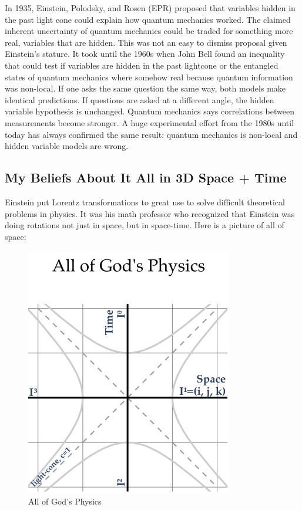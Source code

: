 In 1935, Einstein, Polodsky, and Rosen (EPR) proposed that variables
hidden in the past light cone could explain how quantum mechanics
worked. The claimed inherent uncertainty of quantum mechanics could be
traded for something more real, variables that are hidden. This was not
an easy to dismiss proposal given Einstein's stature. It took until the
1960s when John Bell found an inequality that could test if variables
are hidden in the past lightcone or the entangled states of quantum
mechanics where somehow real because quantum information was non-local.
If one asks the same question the same way, both models make identical
predictions. If questions are asked at a different angle, the hidden
variable hypothesis is unchanged. Quantum mechanics says correlations
between measurements become stronger. A huge experimental effort from
the 1980s until today has always confirmed the same result: quantum
mechanics is non-local and hidden variable models are wrong.

\hypertarget{my-beliefs-about-it-all-in-3d-space-time}{%
\subsection{My Beliefs About It All in 3D Space +
Time}\label{my-beliefs-about-it-all-in-3d-space-time}}

Einstein put Lorentz transformations to great use to solve difficult
theoretical problems in physics. It was his math professor who
recognized that Einstein was doing rotations not just in space, but in
space-time. Here is a picture of all of space:

\begin{figure}
\centering
\includegraphics{../images/QM/BellsFuture/Bells_future_QM_all.jpg}
\caption{All of God's Physics}
\end{figure}

